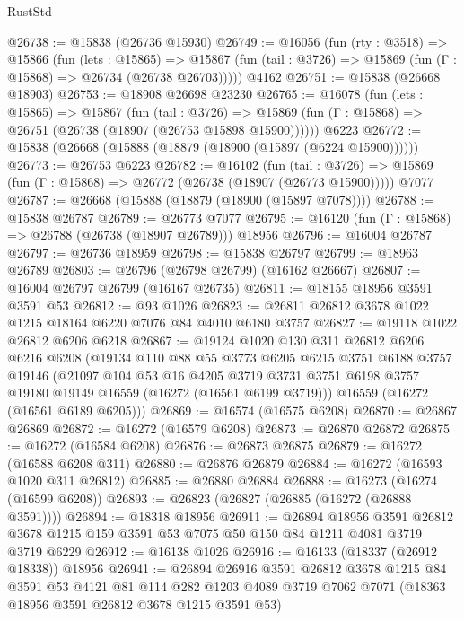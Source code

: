 \begin{lexlean}{RustStd}
\begin{coremodule}
@26738 := @15838 (@26736 @15930)
@26749 := @16056
    (fun (rty : @3518) =>
    @15866
      (fun (lets : @15865) =>
      @15867 (fun (tail : @3726) => @15869 (fun (Γ : @15868) => @26734 (@26738 @26703)))))
    @4162
@26751 := @15838 (@26668 @18903)
@26753 := @18908 @26698 @23230
@26765 := @16078
    (fun (lets : @15865) =>
    @15867
      (fun (tail : @3726) =>
      @15869 (fun (Γ : @15868) => @26751 (@26738 (@18907 (@26753 @15898 @15900))))))
    @6223
@26772 := @15838 (@26668 (@15888 (@18879 (@18900 (@15897 (@6224 @15900))))))
@26773 := @26753 @6223
@26782 := @16102
    (fun (tail : @3726) => @15869 (fun (Γ : @15868) => @26772 (@26738 (@18907 (@26773 @15900)))))
    @7077
@26787 := @26668 (@15888 (@18879 (@18900 (@15897 @7078))))
@26788 := @15838 @26787
@26789 := @26773 @7077
@26795 := @16120 (fun (Γ : @15868) => @26788 (@26738 (@18907 @26789))) @18956
@26796 := @16004 @26787
@26797 := @26736 @18959
@26798 := @15838 @26797
@26799 := @18963 @26789
@26803 := @26796 (@26798 @26799) (@16162 @26667)
@26807 := @16004 @26797 @26799 (@16167 @26735)
@26811 := @18155 @18956 @3591 @3591 @53
@26812 := @93 @1026
@26823 := @26811 @26812 @3678 @1022 @1215 @18164 @6220 @7076 @84 @4010 @6180 @3757
@26827 := @19118 @1022 @26812 @6206 @6218
@26867 := @19124
    @1020
    @130
    @311
    @26812
    @6206
    @6216
    @6208
    (@19134
      @110
      @88
      @55
      @3773
      @6205
      @6215
      @3751
      @6188
      @3757
      @19146
      (@21097
        @104
        @53
        @16
        @4205
        @3719
        @3731
        @3751
        @6198
        @3757
        @19180
        @19149
        @16559
        (@16272 (@16561 @6199 @3719)))
      @16559
      (@16272 (@16561 @6189 @6205)))
@26869 := @16574 (@16575 @6208)
@26870 := @26867 @26869
@26872 := @16272 (@16579 @6208)
@26873 := @26870 @26872
@26875 := @16272 (@16584 @6208)
@26876 := @26873 @26875
@26879 := @16272 (@16588 @6208 @311)
@26880 := @26876 @26879
@26884 := @16272 (@16593 @1020 @311 @26812)
@26885 := @26880 @26884
@26888 := @16273 (@16274 (@16599 @6208))
@26893 := @26823 (@26827 (@26885 (@16272 (@26888 @3591))))
@26894 := @18318 @18956
@26911 := @26894
    @18956
    @3591
    @26812
    @3678
    @1215
    @159
    @3591
    @53
    @7075
    @50
    @150
    @84
    @1211
    @4081
    @3719
    @3719
    @6229
@26912 := @16138 @1026
@26916 := @16133 (@18337 (@26912 @18338)) @18956
@26941 := @26894
    @26916
    @3591
    @26812
    @3678
    @1215
    @84
    @3591
    @53
    @4121
    @81
    @114
    @282
    @1203
    @4089
    @3719
    @7062
    @7071
    (@18363 @18956 @3591 @26812 @3678 @1215 @3591 @53)

\end{coremodule}
\end{lexlean}

